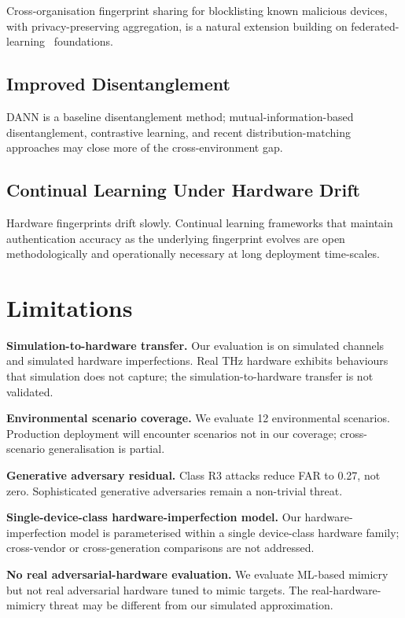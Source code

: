\documentclass[sigconf,nonacm]{acmart}
\begin{document}
Cross-organisation fingerprint sharing for blocklisting known
malicious devices, with privacy-preserving aggregation, is a
natural extension building on
federated-learning~\cite{kairouz2024fedml} foundations.

\subsection{Improved Disentanglement}

DANN is a baseline disentanglement method; mutual-information-based
disentanglement, contrastive learning, and recent
distribution-matching approaches may close more of the
cross-environment gap.

\subsection{Continual Learning Under Hardware Drift}

Hardware fingerprints drift slowly. Continual learning frameworks
that maintain authentication accuracy as the underlying
fingerprint evolves are open methodologically and operationally
necessary at long deployment time-scales.

\section{Limitations}

\textbf{Simulation-to-hardware transfer.} Our evaluation is on
simulated channels and simulated hardware imperfections. Real
THz hardware exhibits behaviours that simulation does not capture;
the simulation-to-hardware transfer is not validated.

\textbf{Environmental scenario coverage.} We evaluate 12
environmental scenarios. Production deployment will encounter
scenarios not in our coverage; cross-scenario generalisation
is partial.

\textbf{Generative adversary residual.} Class R3 attacks reduce
FAR to 0.27, not zero. Sophisticated generative adversaries
remain a non-trivial threat.

\textbf{Single-device-class hardware-imperfection model.} Our
hardware-imperfection model is parameterised within a single
device-class hardware family; cross-vendor or cross-generation
comparisons are not addressed.

\textbf{No real adversarial-hardware evaluation.} We evaluate
ML-based mimicry but not real adversarial hardware tuned to
mimic targets. The real-hardware-mimicry threat may be different
from our simulated approximation.
\end{document}
